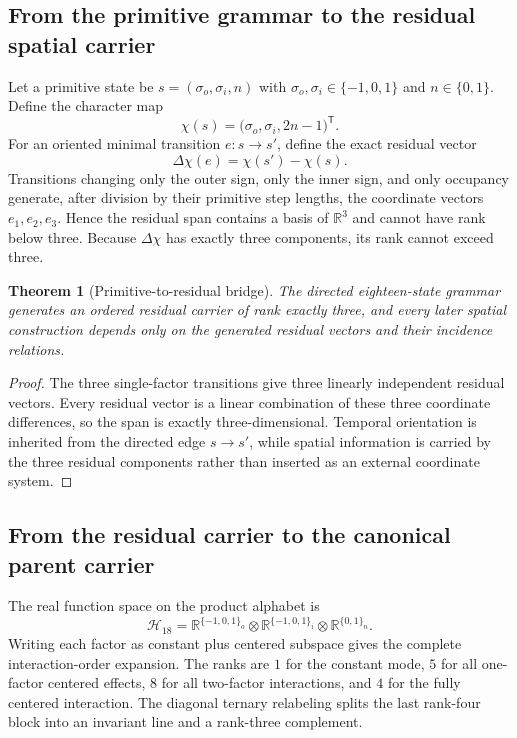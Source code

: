 \documentclass[11pt]{article}
\numberwithin{equation}{section}
\newtheorem{theorem}[definition]{Theorem}
\theoremstyle{remark}
\begin{document}
\subsection{From the primitive grammar to the residual spatial carrier}
Let a primitive state be $s=(\sigma_o,\sigma_i,n)$ with $\sigma_o,\sigma_i\in\{-1,0,1\}$ and $n\in\{0,1\}$. Define the character map
\begin{equation}
\chi(s)=\bigl(\sigma_o,\sigma_i,2n-1\bigr)^{\mathsf T}.
\end{equation}
For an oriented minimal transition $e:s\to s'$, define the exact residual vector
\begin{equation}
\Delta\chi(e)=\chi(s')-\chi(s).
\end{equation}
Transitions changing only the outer sign, only the inner sign, and only occupancy generate, after division by their primitive step lengths, the coordinate vectors $e_1,e_2,e_3$. Hence the residual span contains a basis of $\mathbb R^3$ and cannot have rank below three. Because $\Delta\chi$ has exactly three components, its rank cannot exceed three.

\begin{theorem}[Primitive-to-residual bridge]
The directed eighteen-state grammar generates an ordered residual carrier of rank exactly three, and every later spatial construction depends only on the generated residual vectors and their incidence relations.
\end{theorem}
\begin{proof}
The three single-factor transitions give three linearly independent residual vectors. Every residual vector is a linear combination of these three coordinate differences, so the span is exactly three-dimensional. Temporal orientation is inherited from the directed edge $s\to s'$, while spatial information is carried by the three residual components rather than inserted as an external coordinate system.
\end{proof}

\subsection{From the residual carrier to the canonical parent carrier}
The real function space on the product alphabet is
\begin{equation}
\mathcal H_{18}=\mathbb R^{\{ -1,0,1\}_{o}}\otimes
\mathbb R^{\{ -1,0,1\}_{i}}\otimes
\mathbb R^{\{0,1\}_{n}}.
\end{equation}
Writing each factor as constant plus centered subspace gives the complete interaction-order expansion. The ranks are $1$ for the constant mode, $5$ for all one-factor centered effects, $8$ for all two-factor interactions, and $4$ for the fully centered interaction. The diagonal ternary relabeling splits the last rank-four block into an invariant line and a rank-three complement.
\end{document}
